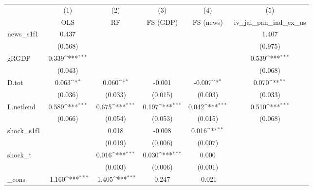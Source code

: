 {
\def\sym#1{\ifmmode^{#1}\else\(^{#1}\)\fi}
\begin{tabular}{l*{5}{c}}
\toprule
            &\multicolumn{1}{c}{(1)}&\multicolumn{1}{c}{(2)}&\multicolumn{1}{c}{(3)}&\multicolumn{1}{c}{(4)}&\multicolumn{1}{c}{(5)}\\
            &\multicolumn{1}{c}{OLS}&\multicolumn{1}{c}{RF}&\multicolumn{1}{c}{FS (GDP)}&\multicolumn{1}{c}{FS (news)}&\multicolumn{1}{c}{iv\_jai\_pan\_ind\_ex\_us}\\
\midrule
news\_s1f1   &       0.437         &                     &                     &                     &       1.407         \\
            &     (0.568)         &                     &                     &                     &     (0.975)         \\
\addlinespace
gRGDP       &       0.339\sym{***}&                     &                     &                     &       0.539\sym{***}\\
            &     (0.043)         &                     &                     &                     &     (0.068)         \\
\addlinespace
D.tot       &       0.063\sym{*}  &       0.060\sym{*}  &      -0.001         &      -0.007\sym{*}  &       0.070\sym{**} \\
            &     (0.036)         &     (0.033)         &     (0.015)         &     (0.003)         &     (0.033)         \\
\addlinespace
L.netlend   &       0.589\sym{***}&       0.675\sym{***}&       0.197\sym{***}&       0.042\sym{***}&       0.510\sym{***}\\
            &     (0.066)         &     (0.054)         &     (0.053)         &     (0.015)         &     (0.068)         \\
\addlinespace
shock\_s1f1  &                     &       0.018         &      -0.008         &       0.016\sym{**} &                     \\
            &                     &     (0.019)         &     (0.006)         &     (0.007)         &                     \\
\addlinespace
shock\_t     &                     &       0.016\sym{***}&       0.030\sym{***}&       0.000         &                     \\
            &                     &     (0.003)         &     (0.006)         &     (0.001)         &                     \\
\addlinespace
\_cons      &      -1.160\sym{***}&      -1.405\sym{***}&       0.247         &      -0.021         &                     \\

\end{tabular}}
